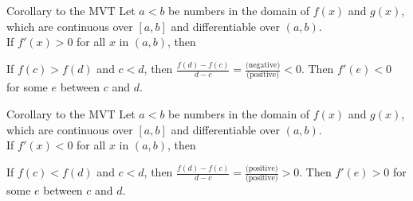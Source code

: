 \begin{frame}[t]
\begin{block}{Corollary to the MVT}
Let $a<b$ be numbers in the domain of $f(x)$ and $g(x)$, which are continuous over $[a,b]$ and differentiable over $(a,b)$.\\[1em]
\vfill\color{C1}
If $f'(x)>0$ for all $x$ in $(a,b)$, then \pause
\iftoggle{printsolutions}{\alert{$f(x)$ is increasing. That is, $f(c)<f(d)$ for all $c<d$ in $[a,b]$.}  }{\\[2em]~}
\end{block}\vfill

\parbox{.3\textwidth}{
}
\color{answercolor}
\parbox{.6\textwidth}{
If $f(c)>f(d)$ and $c<d$, then $\frac{f(d)-f(c)}{d-c}=\frac{\text{(negative)}}{\text{(positive)}}<0$. Then $f'(e)<0$ for some $e$ between $c$ and $d$.}
\vfill
{}
\end{frame}
\begin{frame}[t]
\begin{block}{Corollary to the MVT}
Let $a<b$ be numbers in the domain of $f(x)$ and $g(x)$, which are continuous over $[a,b]$ and differentiable over $(a,b)$.\\[1em]
\vfill\color{C1}
If $f'(x)<0$ for all $x$ in $(a,b)$, then \pause
\iftoggle{printsolutions}{\alert{$f(x)$ is decreasing. That is, $f(d)<f(c)$ for all $c<d$ in $[a,b]$.}  }{\\[2em]~}
\end{block}\vfill

\parbox{.3\textwidth}{
}
\color{answercolor}
\parbox{.6\textwidth}{
If $f(c)<f(d)$ and $c<d$, then $\frac{f(d)-f(c)}{d-c}=\frac{\text{(positive)}}{\text{(positive)}}>0$. Then $f'(e)>0$ for some $e$ between $c$ and $d$.}
\vfill
{}
\end{frame}

